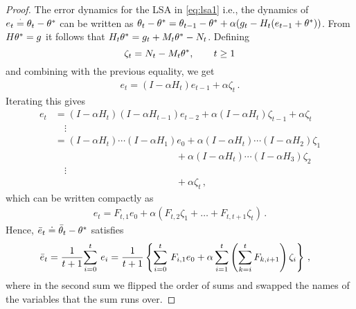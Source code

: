 \begin{proof}
The error dynamics for the LSA in \eqref{eq:lsa1} i.e., the dynamics of $e_t\eqdef\theta_t-\ts$ can be written as 
$\theta_t-\ts=\theta_{t-1}-\ts+\alpha(g_t -H_t(e_{t-1}+\ts))$.
From $H\ts=g$ it follows that $H_t\theta^* = g_t + M_t\ts - N_t$. Defining 
\[
\zeta_t = N_t - M_t \ts, \qquad t\ge 1
\] and combining with the previous equality, we get
\begin{align}\label{lsergen}
e_t=(I-\alpha H_t)e_{t-1}+\alpha \zeta_t\,.
\end{align}
Iterating this gives
\begin{align*}
e_t 
& = (I-\alpha H_t) (I-\alpha H_{t-1}) e_{t-2} + \alpha (I-\alpha H_t) \zeta_{t-1} +\alpha \zeta_t \\
& \quad \vdots\\
& = (I-\alpha H_t) \cdots (I-\alpha H_1) e_0 + \alpha (I-\alpha H_t) \cdots (I-\alpha H_2) \zeta_1 \\
&  \qquad \qquad\qquad \qquad\qquad \qquad\,\,\, + \alpha (I-\alpha H_t) \cdots (I-\alpha H_3) \zeta_2\\
&  \quad \vdots \\
& \qquad \qquad\qquad \qquad\qquad \qquad\,\,\, + \alpha \zeta_t\,,
\end{align*}
which can be written compactly as
\begin{align*}
e_t = F_{t,1} e_0 + \alpha (F_{t,2} \zeta_1 + \dots + F_{t,t+1} \zeta_t )\,.
\end{align*}
Hence, $\eb_t \doteq \tb_t-\ts$ satisfies
\begin{align*}
\eb_t&=\frac{1}{t+1}\ous{\sum}{i=0}{t}e_i
=\frac{1}{t+1}\left\{\ous{\sum}{i=0}{t} F_{i,1} e_0+ \alpha \sum_{i=1}^{t} \left(\sum_{k=i}^{t} F_{k,i+1} \right)\zeta_i   \right\}\,,
\end{align*}
where in the second sum we flipped the order of sums and swapped the names of the variables that the sum runs over.


\end{proof}
